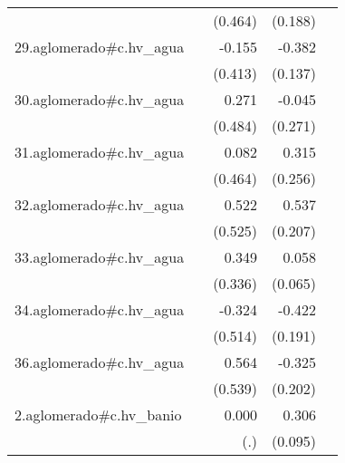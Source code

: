 {\begin{longtable}{l*{4}{D{.}{.}{-1}}}
            &                     &     (0.464)         &     (0.188)         &                     \\
\addlinespace
29.aglomerado#c.hv\_agua&                     &      -0.155         &      -0.382\sym{**} &                     \\
            &                     &     (0.413)         &     (0.137)         &                     \\
\addlinespace
30.aglomerado#c.hv\_agua&                     &       0.271         &      -0.045         &                     \\
            &                     &     (0.484)         &     (0.271)         &                     \\
\addlinespace
31.aglomerado#c.hv\_agua&                     &       0.082         &       0.315         &                     \\
            &                     &     (0.464)         &     (0.256)         &                     \\
\addlinespace
32.aglomerado#c.hv\_agua&                     &       0.522         &       0.537\sym{**} &                     \\
            &                     &     (0.525)         &     (0.207)         &                     \\
\addlinespace
33.aglomerado#c.hv\_agua&                     &       0.349         &       0.058         &                     \\
            &                     &     (0.336)         &     (0.065)         &                     \\
\addlinespace
34.aglomerado#c.hv\_agua&                     &      -0.324         &      -0.422\sym{*}  &                     \\
            &                     &     (0.514)         &     (0.191)         &                     \\
\addlinespace
36.aglomerado#c.hv\_agua&                     &       0.564         &      -0.325         &                     \\
            &                     &     (0.539)         &     (0.202)         &                     \\
\addlinespace
2.aglomerado#c.hv\_banio&                     &       0.000         &       0.306\sym{**} &                     \\
            &                     &         (.)         &     (0.095)         &                     \\

\end{longtable}}
